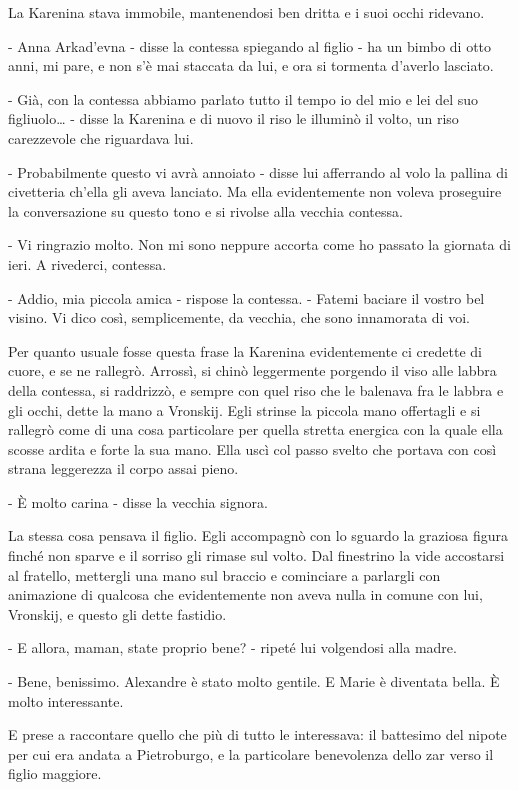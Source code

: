 La Karenina stava immobile, mantenendosi ben dritta e i suoi occhi ridevano. 

- Anna Arkad'evna - disse la contessa spiegando al figlio - ha un bimbo di otto anni, mi pare, e non s'è mai staccata da lui, e ora si tormenta d'averlo lasciato. 

- Già, con la contessa abbiamo parlato tutto il tempo io del mio e lei del suo figliuolo\ldots{} - disse la Karenina e di nuovo il riso le illuminò il volto, un riso carezzevole che riguardava lui. 

- Probabilmente questo vi avrà annoiato - disse lui afferrando al volo la pallina di civetteria ch'ella gli aveva lanciato. Ma ella evidentemente non voleva proseguire la conversazione su questo tono e si rivolse alla vecchia contessa. 

- Vi ringrazio molto. Non mi sono neppure accorta come ho passato la giornata di ieri. A rivederci, contessa. 

- Addio, mia piccola amica - rispose la contessa. - Fatemi baciare il vostro bel visino. Vi dico così, semplicemente, da vecchia, che sono innamorata di voi. 

Per quanto usuale fosse questa frase la Karenina evidentemente ci credette di cuore, e se ne rallegrò. Arrossì, si chinò leggermente porgendo il viso alle labbra della contessa, si raddrizzò, e sempre con quel riso che le balenava fra le labbra e gli occhi, dette la mano a Vronskij. Egli strinse la piccola mano offertagli e si rallegrò come di una cosa particolare per quella stretta energica con la quale ella scosse ardita e forte la sua mano. Ella uscì col passo svelto che portava con così strana leggerezza il corpo assai pieno. 

- È molto carina - disse la vecchia signora. 

La stessa cosa pensava il figlio. Egli accompagnò con lo sguardo la graziosa figura finché non sparve e il sorriso gli rimase sul volto. Dal finestrino la vide accostarsi al fratello, mettergli una mano sul braccio e cominciare a parlargli con animazione di qualcosa che evidentemente non aveva nulla in comune con lui, Vronskij, e questo gli dette fastidio. 

- E allora, maman, state proprio bene? - ripeté lui volgendosi alla madre. 

- Bene, benissimo. Alexandre è stato molto gentile. E Marie è diventata bella. È molto interessante. 

E prese a raccontare quello che più di tutto le interessava: il battesimo del nipote per cui era andata a Pietroburgo, e la particolare benevolenza dello zar verso il figlio maggiore. 

